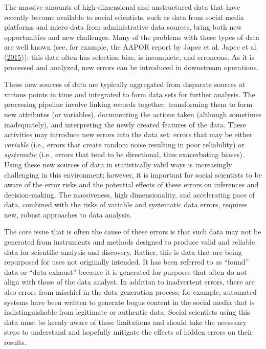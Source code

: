\documentclass[]{krantz}
\begin{document}
The massive amounts of high-dimensional and unstructured data that have
recently become available to social scientists, such as data from social
media platforms and micro-data from administrative data sources, bring
both new opportunities and new challenges. Many of the problems with
these types of data are well known (see, for example, the AAPOR report
by Japec et al. Japec et al.
(\protect\hyperlink{ref-japec2015big}{2015})): this data often has
selection bias, is incomplete, and erroneous. As it is processed and
analyzed, new errors can be introduced in downstream operations.

These new sources of data are typically aggregated from disparate
sources at various points in time and integrated to form data sets for
further analysis. The processing pipeline involve linking records
together, transforming them to form new attributes (or variables),
documenting the actions taken (although sometimes inadequately), and
interpreting the newly created features of the data. These activities
may introduce new errors into the data set: errors that may be either
\emph{variable} (i.e., errors that create random noise resulting in poor
reliability) or \emph{systematic} (i.e., errors that tend to be
directional, thus exacerbating biases). Using these new sources of data
in statistically valid ways is increasingly challenging in this
environment; however, it is important for social scientists to be aware
of the error risks and the potential effects of these errors on
inferences and decision-making. The massiveness, high dimensionality,
and accelerating pace of data, combined with the risks of variable and
systematic data errors, requires new, robust approaches to data
analysis.

The core issue that is often the cause of these errors is that such data
may not be generated from instruments and methods designed to produce
valid and reliable data for scientific analysis and discovery. Rather,
this is data that are being repurposed for uses not originally intended.
It has been referred to as ``found'' data or ``data exhaust'' because it
is generated for purposes that often do not align with those of the data
analyst. In addition to inadvertent errors, there are also errors from
mischief in the data generation process; for example, automated systems
have been written to generate bogus content in the social media that is
indistinguishable from legitimate or authentic data. Social scientists
using this data must be keenly aware of these limitations and should
take the necessary steps to understand and hopefully mitigate the
effects of hidden errors on their results.
\end{document}
